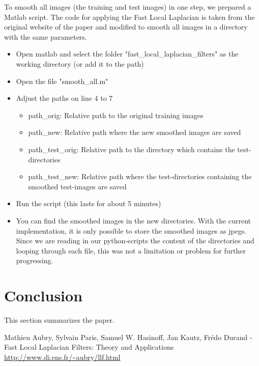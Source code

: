 To smooth all images (the training and test images) in one step, we prepared a Matlab script. The code for applying the Fast Local Laplacian is taken from the original website of the paper \cite{FLL} and modified to smooth all images in a directory with the same parameters.
\begin{itemize}
\item Open matlab and select the folder "fast\_local\_laplacian\_filters" as the working directory (or add it to the path)
\item Open the file "smooth\_all.m"
\item Adjust the paths on line 4 to 7
\begin{itemize}
\item path\_orig: Relative path to the original training images
\item path\_new: Relative path where the new smoothed images are saved
\item path\_test\_orig: Relative path to the directory which contains the test-directories
\item path\_test\_new: Relative path where the test-directories containing the smoothed test-images are saved
\end{itemize}
\item Run the script (this lasts for about 5 minutes)
\item You can find the smoothed images in the new directories. With the current implementation, it is only possible to store the smoothed images as jpegs. Since we are reading in our python-scripts the content of the directories and looping through each file, this was not a limitation or problem for further progressing.
\end{itemize}

\section{Conclusion}
	This section summarizes the paper.

\begin{thebibliography}{5}

    Mathieu Aubry, Sylvain Paris, Samuel W. Hasinoff, Jan Kautz, Frédo Durand -  Fast Local Laplacian Filters: Theory and Applications 
    \url{http://www.di.ens.fr/~aubry/llf.html}

\end{thebibliography}